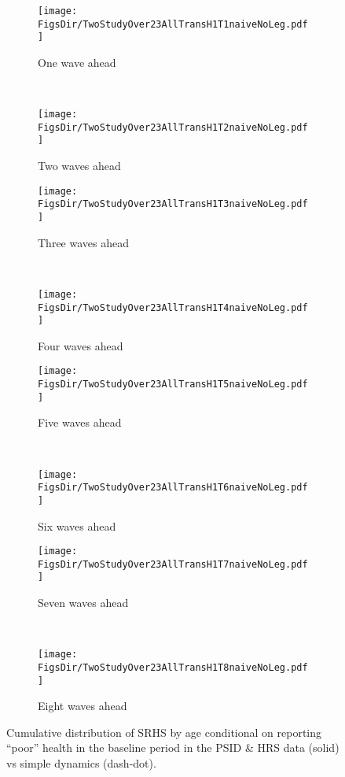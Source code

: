 \documentclass[12pt,pdftex,letterpaper]{article}
\newcommand{\RootDir}{..}
\newcommand{\FigsDir}{\RootDir/Figures}
\begin{document}
\begin{figure}
	\centering
	\begin{subfigure}[b]{0.45\textwidth}
		\texttt{[image: \\FigsDir/TwoStudyOver23AllTransH1T1naiveNoLeg.pdf]}
		\caption{One wave ahead}\label{fig:Naive1AheadPoor}
	\end{subfigure}
	~
	\begin{subfigure}[b]{0.45\textwidth}
		\texttt{[image: \\FigsDir/TwoStudyOver23AllTransH1T2naiveNoLeg.pdf]}
		\caption{Two waves ahead}\label{fig:Naive2AheadPoor}
	\end{subfigure}
	
	\begin{subfigure}[b]{0.45\textwidth}
		\texttt{[image: \\FigsDir/TwoStudyOver23AllTransH1T3naiveNoLeg.pdf]}
		\caption{Three waves ahead}\label{fig:Naive3AheadPoor}
	\end{subfigure}
	~
	\begin{subfigure}[b]{0.45\textwidth}
		\texttt{[image: \\FigsDir/TwoStudyOver23AllTransH1T4naiveNoLeg.pdf]}
		\caption{Four waves ahead}\label{fig:Naive4AheadPoor}
	\end{subfigure}
	
	\begin{subfigure}[b]{0.45\textwidth}
		\texttt{[image: \\FigsDir/TwoStudyOver23AllTransH1T5naiveNoLeg.pdf]}
		\caption{Five waves ahead}\label{fig:Naive5AheadPoor}
	\end{subfigure}
	~
	\begin{subfigure}[b]{0.45\textwidth}
		\texttt{[image: \\FigsDir/TwoStudyOver23AllTransH1T6naiveNoLeg.pdf]}
		\caption{Six waves ahead}\label{fig:Naive6AheadPoor}
	\end{subfigure}
	
	\begin{subfigure}[b]{0.45\textwidth}
		\texttt{[image: \\FigsDir/TwoStudyOver23AllTransH1T7naiveNoLeg.pdf]}
		\caption{Seven waves ahead}\label{fig:Naive7AheadPoor}
	\end{subfigure}
	~
	\begin{subfigure}[b]{0.45\textwidth}
		\texttt{[image: \\FigsDir/TwoStudyOver23AllTransH1T8naiveNoLeg.pdf]}
		\caption{Eight waves ahead}\label{fig:Naive8AheadPoor}
	\end{subfigure}
	\caption{Cumulative distribution of SRHS by age conditional on reporting ``poor'' health in the baseline period in the PSID \& HRS data (solid) vs simple dynamics (dash-dot).}\label{fig:NaiveTransPR}
\end{figure}
\end{document}

